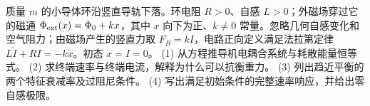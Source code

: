 质量 \(m\) 的小导体环沿竖直导轨下落。环电阻 \(R>0\)、自感 \(L>0\)；外磁场穿过它的磁通 \(\Phi_{\rm ext}(x)=\Phi_0+kx\)，其中 \(x\) 向下为正、\(k\ne0\) 常量。忽略几何自感变化和空气阻力；由磁场产生的竖直力取 \(F_B=kI\)，电路正向定义满足法拉第定律 \(L\dot I+RI=-k\dot x\)。初态 \(\dot x=I=0\)。
(1) 从方程推导机电耦合系统与耗散能量恒等式。
(2) 求终端速率与终端电流，解释为什么可以抗衡重力。
(3) 列出趋近平衡的两个特征衰减率及过阻尼条件。
(4) 写出满足初始条件的完整速率响应，并给出零自感极限。
